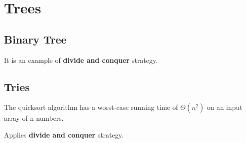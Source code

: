 \chapter{Trees}
\section{Binary Tree}

It is an example of \textbf{divide and conquer} strategy.

\section{Tries}

The quicksort algorithm has a worst-case running time of $\Theta(n^{2})$ on an input array of n numbers.

Applies \textbf{divide and conquer} strategy.

